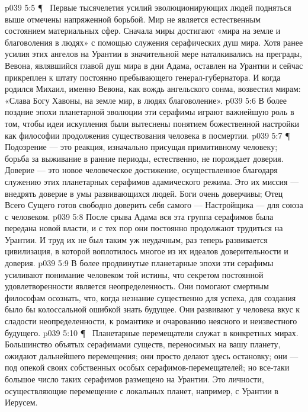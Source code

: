 \vs p039 5:5 \P\ \bibnobreakspace {} Первые тысячелетия усилий эволюционирующих людей подняться выше отмечены напряженной борьбой. Мир не является естественным состоянием материальных сфер. Сначала миры достигают «мира на земле и благоволения в людях» с помощью служения серафических душ мира. Хотя ранее усилия этих ангелов на Урантии в значительной мере наталкивались на преграды, Вевона, являвшийся главой душ мира в дни Адама, оставлен на Урантии и сейчас прикреплен к штату постоянно пребывающего генерал\hyp{}губернатора. И когда родился Михаил, именно Вевона, как вождь ангельского сонма, возвестил мирам: «Слава Богу Хавоны, на земле мир, в людях благоволение».
\vs p039 5:6 В более поздние эпохи планетарной эволюции эти серафимы играют важнейшую роль в том, чтобы идеи искупления были вытеснены понятием божественной настройки как философии продолжения существования человека в посмертии.
\vs p039 5:7 \P\ \bibnobreakspace {} Подозрение --- это реакция, изначально присущая примитивному человеку; борьба за выживание в ранние периоды, естественно, не порождает доверия. Доверие --- это новое человеческое достижение, осуществленное благодаря служению этих планетарных серафимов адамического режима. Это их миссия --- внедрять доверие в умы развивающихся людей. Боги очень доверчивы; Отец Всего Сущего готов свободно доверить себя самого --- Настройщика --- для союза с человеком.
\vs p039 5:8 После срыва Адама вся эта группа серафимов была передана новой власти, и с тех пор они постоянно продолжают трудиться на Урантии. И труд их не был таким уж неудачным, раз теперь развивается цивилизация, в которой воплотилось многое из их идеалов доверительности и доверия.
\vs p039 5:9 В более продвинутые планетарные эпохи эти серафимы усиливают понимание человеком той истины, что секретом постоянной удовлетворенности является неопределенность. Они помогают смертным философам осознать, что, когда незнание существенно для успеха, для создания было бы колоссальной ошибкой знать будущее. Они развивают у человека вкус к сладости неопределенности, к романтике и очарованию неясного и неизвестного будущего.
\vs p039 5:10 \P\ \bibnobreakspace {} Планетарные перемещатели служат в конкретных мирах. Большинство объятых серафимами существ, переносимых на вашу планету, ожидают дальнейшего перемещения; они просто делают здесь остановку; они --- под опекой своих собственных особых серафимов\hyp{}перемещателей; но все\hyp{}таки большое число таких серафимов размещено на Урантии. Это личности, осуществляющие перемещение с локальных планет, например, с Урантии в Иерусем.
